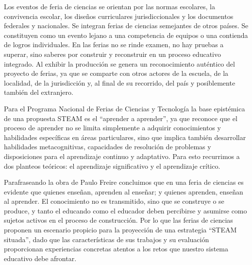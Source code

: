 Los eventos de feria de ciencias se orientan por las normas escolares, la convivencia escolar, los diseños curriculares jurisdiccionales y los documentos federales y nacionales. Se integran ferias de ciencias semejantes de otros países. Se constituyen como un evento lejano a una competencia de equipos o una contienda de logros individuales. En las ferias no se rinde examen, no hay pruebas a superar, sino saberes por construir y reconstruir en un proceso educativo integrado. Al exhibir la producción se genera un reconocimiento auténtico del proyecto de ferias, ya que se comparte con otros actores de la escuela, de la localidad, de la jurisdicción y, al final de su recorrido, del país y posiblemente también del extranjero.

Para el Programa Nacional de Ferias de Ciencias y Tecnología la base epistémica de una propuesta STEAM es el “aprender a aprender”, ya que reconoce que el proceso de aprender no se limita simplemente a adquirir conocimientos y habilidades específicas en áreas particulares, sino que implica también desarrollar habilidades metacognitivas, capacidades de resolución de problemas y disposiciones para el aprendizaje continuo y adaptativo. Para esto recurrimos a dos planteos teóricos: el aprendizaje significativo y el aprendizaje crítico.

Parafraseando la obra de Paulo Freire concluimos que en una feria de ciencias es evidente que quienes enseñan, aprenden al enseñar; y quienes aprenden, enseñan al aprender. El conocimiento no es transmitido, sino que se construye o se produce, y tanto el educando como el educador deben percibirse y asumirse como sujetos activos en el proceso de construcción. Por lo que las ferias de ciencias proponen un escenario propicio para la proyección de una estrategia “STEAM situada”, dado que las características de sus trabajos y su evaluación proporcionan experiencias concretas atentos a los retos que nuestro sistema educativo debe afrontar.

